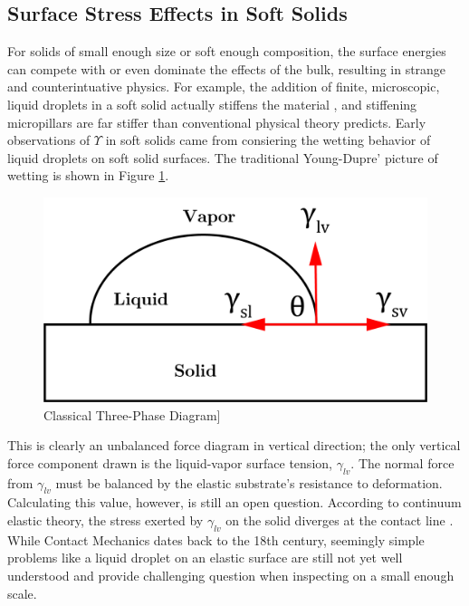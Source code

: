 \subsection{Surface Stress Effects in Soft Solids}
For solids of small enough size or soft enough composition, the surface energies can compete with or even dominate the effects of the bulk, resulting in strange and counterintuative physics. For example, the addition of finite, microscopic, liquid droplets in a soft solid actually stiffens the material \cite{style2015stiffening}, and stiffening micropillars are far stiffer than conventional physical theory predicts. 
Early observations of $ \Upsilon $ in soft solids came from consiering the wetting behavior of liquid droplets on soft solid surfaces.  The traditional Young-Dupre' picture of wetting is shown in Figure \ref{fig:three-phase}.
\begin{figure}[h!]
	\centering
	\includegraphics[width=.6\textwidth]{Chapters/Figures/phase_diagram.PNG}
	\caption[Three-Phase Diagram]{Classical Three-Phase Diagram]}
	\label{fig:three-phase} 
\end{figure}
This is clearly an unbalanced force diagram in vertical direction; the only vertical force component drawn is the liquid-vapor surface tension, $ \gamma_{lv} $. The normal force from $\gamma_{lv}$ must be balanced by the elastic substrate's resistance to deformation. Calculating this value, however, is still an open question. According to continuum elastic theory, the stress exerted by $\gamma_{lv}$ on the solid diverges at the contact line \cite{jerison2011deformation}. While Contact Mechanics dates back to the 18th century, seemingly simple problems like a liquid droplet on an elastic surface are still not yet well understood and provide challenging question when inspecting on a small enough scale.



